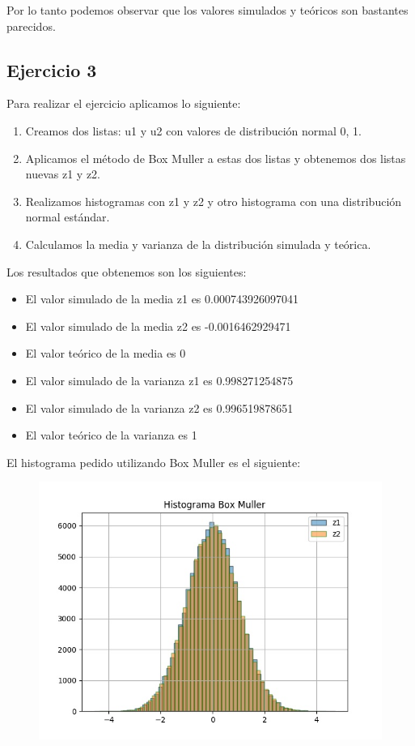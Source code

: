 \documentclass[11pt,a4paper]{article}
\begin{document}
		Por lo tanto podemos observar que los valores simulados y teóricos son bastantes parecidos.

	\subsection{Ejercicio 3}
	    Para realizar el ejercicio aplicamos lo siguiente:
	    \begin{enumerate}
	        \item Creamos dos listas: u1 y u2 con valores de distribución normal 0, 1.
	        \item Aplicamos el método de Box Muller a estas dos listas y obtenemos dos listas nuevas z1 y z2.
	        \item Realizamos histogramas con z1 y z2 y otro histograma con una distribución normal estándar.
	        \item Calculamos la media y varianza de la distribución simulada y teórica.
	    \end{enumerate}

		Los resultados que obtenemos son los siguientes:
		\begin{itemize}
			\item El valor simulado de la media z1 es 0.000743926097041
			\item El valor simulado de la media z2 es -0.0016462929471
			\item El valor teórico de la media es 0 
			\item El valor simulado de la varianza z1 es 0.998271254875
			\item El valor simulado de la varianza z2 es 0.996519878651
			\item El valor teórico de la varianza es 1
		\end{itemize}

		El histograma pedido utilizando Box Muller es el siguiente:
		\begin{figure}[H]
  			\centering
    			\includegraphics[width=14cm]{imagenes/histogramaEjer3}
		\end{figure}
\end{document}
